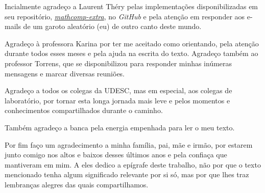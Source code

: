 \begin{agradecimentos}
	Incialmente agradeço a Laurent Théry pelas implementações disponibilizadas em seu repositório, \hyperlink{https://github.com/thery/mathcomp-extra/}{\textit{mathcomp-extra}}, no \textit{GitHub} e pela atenção em responder aos e-mails de um garoto aleatório (eu) de outro canto deste mundo.

	Agradeço à professora Karina por ter me aceitado como orientando, pela atenção durante todos esses meses e pela ajuda na escrita do texto. Agradeço também ao professor Torrens, que se disponibilizou para responder minhas inúmeras mensagens e marcar diversas reuniões.

	Agradeço a todos os colegas da UDESC, mas em especial, aos colegas de laboratório, por tornar esta longa jornada mais leve e pelos momentos e conhecimentos compartilhados durante o caminho.

	Também agradeço a banca pela energia empenhada para ler o meu texto.

	Por fim faço um agradecimento a minha família, pai, mãe e irmão, por estarem junto comigo nos altos e baixos desses últimos anos e pela confiaça que mantiveram em mim. A eles dedico a epígrafe deste trabalho, não por que o texto mencionado tenha algum significado relevante por si só, mas por que lhes traz lembranças alegres das quais compartilhamos.
\end{agradecimentos}


